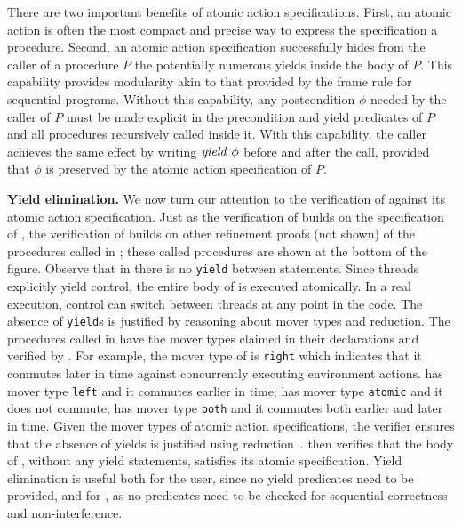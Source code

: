 There are two important benefits of atomic action specifications.
First, an atomic action is often the most compact and precise way to express the specification a procedure.
Second, an atomic action specification successfully hides from the caller of a procedure $P$
the potentially numerous yields inside the body of $P$.
This capability provides modularity akin to that provided by the frame rule for sequential programs.
Without this capability, any postcondition $\phi$ needed by the caller of $P$ must be made explicit in the precondition 
and yield predicates of $P$ and all procedures recursively called inside it.
With this capability, the caller achieves the same effect by writing $\mathit{yield}\ \phi$ before and after the call, 
provided that $\phi$ is preserved by the atomic action specification of $P$.

{\bf Yield elimination.} 
We now turn our attention to the verification of  against
its atomic action specification.
Just as the verification of  builds on the specification of ,
the verification of  builds on other refinement proofs (not shown) 
of the procedures called in ;
these called procedures are shown at the bottom of the figure. 
Observe that in  there is no {\tt yield} between
statements. Since threads explicitly yield control, the
entire body of  is executed atomically. In
a real execution, control can switch between threads at any point in
the code. The absence of {\tt yield}s is justified by reasoning about
mover types and reduction. The procedures called in
 have the mover types claimed in their
declarations and verified by \civl. 
For example, the mover type of  is {\tt right} which indicates 
that it commutes later in time against concurrently executing environment actions.
 has mover type {\tt left} and it commutes earlier in time;
 has mover type {\tt atomic} and it does not commute;
 has mover type {\tt both} and it commutes both earlier and later in time.
Given the mover types of 
atomic action specifications, the \civl verifier ensures
that the absence of yields is justified using reduction~\cite{Lipton75}.  
\civl then verifies that the body of , without any yield statements, satisfies
its atomic specification. Yield elimination is useful both for the
user, since no yield predicates need to be provided, and for \civl,
as no predicates need to be checked for sequential correctness and
non-interference.

